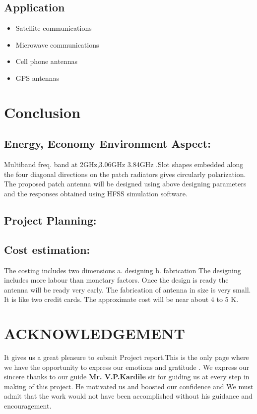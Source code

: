 \documentclass[12pt]{article}
\begin{document}
             \subsection{Application}
             \begin{itemize}
             	\item Satellite communications
             	\item Microwave communications
             	\item Cell phone antennas
             	\item GPS antennas

             \end{itemize}


         	


\cleardoublepage

\section{Conclusion}\label{sec:Conclusion}
    \subsection{Energy, Economy Environment Aspect:}\label{sub:Energy, Economy Environment Aspect:}
       Multiband freq. band at 2GHz,3.06GHz  3.84GHz  .Slot shapes embedded along the four diagonal directions on the patch radiators gives circularly polarization. The proposed patch antenna will be designed using above designing parameters and the responses obtained using HFSS simulation software.
    \subsection{Project Planning:}\label{sub:Project Planning:}

    \subsection{Cost estimation:}\label{sub:Cost estimation:}
      The costing includes two dimensions
      a.  designing
      b. fabrication
      The designing includes more labour than monetary factors. Once the design is ready the antenna will be ready very early.  The fabrication of antenna in size is very small.  It is like two credit cards.
      The approximate cost will be near about 4 to 5 K.
\cleardoublepage

\section{ACKNOWLEDGEMENT}
  \justify
	It gives us a great pleasure to submit  Project report.This is the only page where we have the opportunity to express our emotions and gratitude . We express our sincere thanks to our guide \textbf{Mr. V.P.Kardile} sir for guiding us at every step in making of this project. He motivated us and boosted our confidence and We must admit that the work would not have been accomplished without his guidance and encouragement. \\
\end{document}
